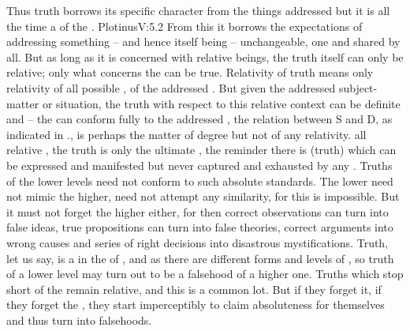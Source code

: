 Thus truth borrows its specific character from the things addressed but it is
all the time a  of the .  \citet{Thus
  veritable truth is not accordance with an external; it is self-accordance; it
  affirms and is nothing other than itself and is nothing other; it is at once
  existence and self-affirmation.}{Plotinus}{V:5.2} From this  it borrows the expectations of addressing something -- and hence
itself being -- unchangeable, one and shared by all.  But as long as it is
concerned with relative beings, the truth itself can only be relative; only what
concerns the  can be  true.
%
Relativity of truth means only relativity of all possible , of the
addressed 
. But given the addressed subject-matter or situation, the truth
with respect to this relative context can be definite and  -- the
 can conform fully to the addressed , the
relation between S and D, as indicated in ., is
perhaps the 
matter of degree but not of any relativity.  all relative , 
the  truth is only the ultimate , the reminder 
there is (truth) which can be expressed and manifested but never captured and
exhausted by any .  Truths of the lower levels need not conform to
such absolute standards. The lower need not mimic the higher, need not
attempt any similarity, for this is impossible. But it must not forget the
higher either, for then correct observations can turn into false ideas, true
propositions can turn into false theories, correct arguments into wrong causes
and series of right decisions into disastrous mystifications. Truth, let us say,
is a  in the  of , and
as there are different forms and levels of , so truth of a
lower level may turn out to be a falsehood of a higher one.  Truths which stop
short of the  remain relative, and this is a common lot. But if
they forget it, if they forget the , they start imperceptibly to
claim absoluteness for themselves and thus turn into falsehoods.  


